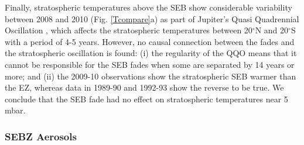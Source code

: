 \documentclass[final,5p,times,twocolumn,authoryear]{elsarticle}
\newcommand{\degree}{\ensuremath{^\circ}}
\begin{document}
Finally, stratospheric temperatures above the SEB show considerable variability between 2008 and 2010 (Fig. \ref{Tcompare}a) as part of Jupiter's Quasi Quadrennial Oscillation \citep[QQO,][]{91leovy}, which affects the stratospheric temperatures between 20\degree N and 20\degree S with a period of 4-5 years.   However, no causal connection between the fades and the stratospheric oscillation is found:  (i) the regularity of the QQO means that it cannot be responsible for the SEB fades when some are separated by 14 years or more; and (ii) the 2009-10 observations show the stratospheric SEB warmer than the EZ, whereas data in 1989-90 and 1992-93 \citep{99friedson} show the reverse to be true. We conclude that the SEB fade had no effect on stratospheric temperatures near 5 mbar.

\begin{figure*}[tbp]
\centering
{}
\caption{\textit{Left:}  Comparing retrieved meridional temperatures at five different pressure levels for 2008 (dashed line), 2009 (dotted line) and 2010 (solid line).  The location of the SEB is denoted by vertical dashed lines.  The grey bars represent the formal uncertainty on the retrieved quantities at each altitude (i.e., taking correlations between parameters into account), which appear large because of the limited retrieval capabilities from 8-point spectral retrievals and the uncertainties in absolute calibration.   However, relative variability in the quantities are robust (similar variations are seen in each filter), even if the absolute values are uncertain.  Some disconnect between northern and southern hemisphere results is apparent at the equator because these observations were acquired on different dates, as shown by the key (top right).  \textit{Right:} Close-up views of thermal changes associated with the SEB at 240, 480 and 630 mbar, with offsets of 2 K from the 2008 temperature profiles to highlight differences.}
\label{Tcompare}
\end{figure*}


\subsubsection{SEBZ Aerosols}
\label{sebz_aer}
\end{document}
